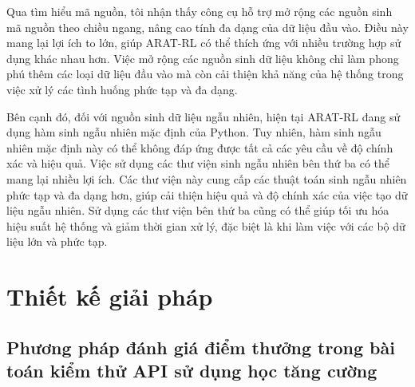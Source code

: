 Qua tìm hiểu mã nguồn, tôi nhận thấy công cụ hỗ trợ mở rộng các nguồn sinh mã nguồn theo chiều ngang, nâng cao tính đa dạng của dữ liệu đầu vào. Điều này mang lại lợi ích to lớn, giúp ARAT-RL có thể thích ứng với nhiều trường hợp sử dụng khác nhau hơn. Việc mở rộng các nguồn sinh dữ liệu không chỉ làm phong phú thêm các loại dữ liệu đầu vào mà còn cải thiện khả năng của hệ thống trong việc xử lý các tình huống phức tạp và đa dạng.

Bên cạnh đó, đối với nguồn sinh dữ liệu ngẫu nhiên, hiện tại ARAT-RL đang sử dụng hàm sinh ngẫu nhiên mặc định của Python. Tuy nhiên, hàm sinh ngẫu nhiên mặc định này có thể không đáp ứng được tất cả các yêu cầu về độ chính xác và hiệu quả. Việc sử dụng các thư viện sinh ngẫu nhiên bên thứ ba có thể mang lại nhiều lợi ích. Các thư viện này cung cấp các thuật toán sinh ngẫu nhiên phức tạp và đa dạng hơn, giúp cải thiện hiệu quả và độ chính xác của việc tạo dữ liệu ngẫu nhiên. Sử dụng các thư viện bên thứ ba cũng có thể giúp tối ưu hóa hiệu suất hệ thống và giảm thời gian xử lý, đặc biệt là khi làm việc với các bộ dữ liệu lớn và phức tạp.



\section{Thiết kế giải pháp}
\subsection{Phương pháp đánh giá điểm thưởng trong bài toán kiểm thử API sử dụng học tăng cường}


